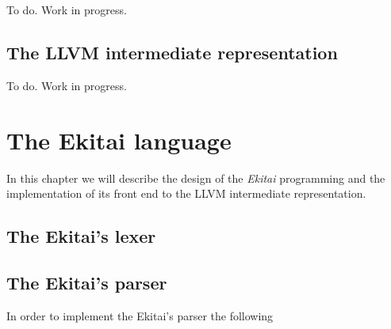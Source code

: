 \documentclass[
  oneside,
  english,
  coorientadorbanca,
  embeddedlogo,
  noabntexcite
]{ufsc-thesis-rn46-2019}
\newcommand{\bnfvars}[1]{\langle\textrm{#1}\rangle}
\newcommand{\bnfor}[1]{\;\mid{} #1}
\newcommand{\bnfprod}[2]{\bnfvars{#1} &\ &::= & #2}
\newcommand{\bnfmore}[1]{ && \mid{} & #1}
\begin{document}
To do. Work in progress.

\section{The LLVM intermediate representation}

To do. Work in progress.

\chapter{The Ekitai language}\label{chapter:proposal}

In this chapter we will describe the design of the \textit{Ekitai} programming and the implementation of its front end to the LLVM intermediate representation.

\section{The Ekitai's lexer}



\section{The Ekitai's parser}

In order to implement the Ekitai's parser the following
\end{document}
